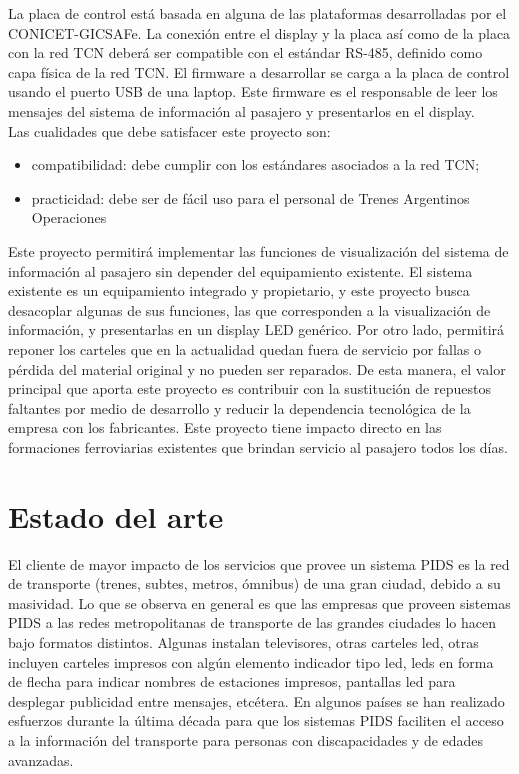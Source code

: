 La placa de control está basada en alguna de las plataformas desarrolladas por el CONICET-GICSAFe. La conexión entre el display y la placa así como de la placa con la red TCN deberá ser compatible con el estándar RS-485, definido como capa física de la red TCN. El
firmware a desarrollar se carga a la placa de control usando el puerto USB de una laptop. Este firmware es el responsable de leer los mensajes del sistema de información al pasajero y presentarlos en el display.\\

Las cualidades que debe satisfacer este proyecto son:
\begin{itemize}
\item compatibilidad: debe cumplir con los estándares asociados a la red TCN;
\item practicidad: debe ser de fácil uso para el personal de Trenes Argentinos Operaciones
\end{itemize}

Este proyecto permitirá implementar las funciones de visualización del sistema de información al pasajero sin depender del equipamiento existente. El sistema existente es un equipamiento integrado y propietario, y este proyecto busca desacoplar algunas de sus funciones, las que corresponden a la visualización de información, y presentarlas en un display LED genérico. Por otro lado, permitirá reponer los carteles que en la actualidad quedan fuera de servicio por fallas o pérdida del material original y no pueden ser reparados. De esta manera, el valor principal que aporta este proyecto es contribuir con la sustitución de repuestos faltantes por medio de desarrollo y reducir la dependencia tecnológica de la empresa con los fabricantes. Este proyecto tiene impacto directo en las formaciones ferroviarias existentes que brindan servicio al pasajero todos los días.

\pagebreak
\section{Estado del arte}



El cliente de mayor impacto de los servicios que provee un sistema PIDS es la red de transporte (trenes, subtes, metros, ómnibus) de una gran ciudad, debido a su masividad. Lo que se observa en general es que las empresas que proveen sistemas PIDS a las redes metropolitanas de transporte de las grandes ciudades lo hacen bajo formatos distintos. Algunas instalan televisores, otras carteles led, otras incluyen carteles impresos con algún elemento indicador tipo led, leds en forma de flecha para indicar nombres de estaciones impresos, pantallas led para desplegar publicidad entre mensajes, etcétera. En algunos países se han realizado esfuerzos durante la última década para que los sistemas PIDS faciliten el acceso a la información del transporte para personas con discapacidades y de edades avanzadas.


